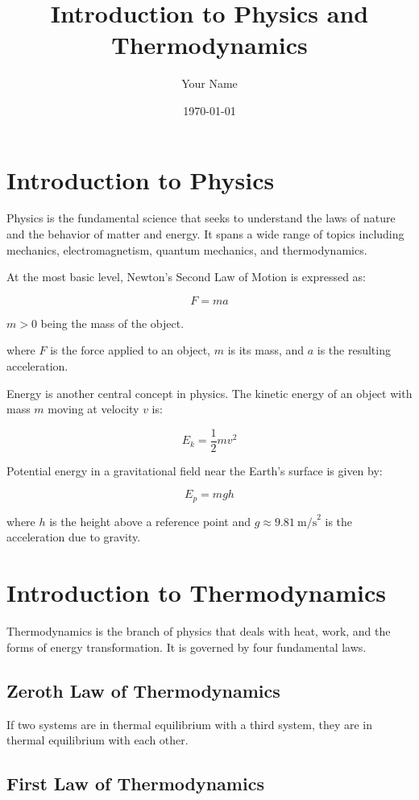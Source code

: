 \documentclass[12pt]{article}
\title{Introduction to Physics and Thermodynamics}
\author{Your Name}
\date{\today}
\begin{document}
\maketitle

\section{Introduction to Physics}

Physics is the fundamental science that seeks to understand the laws of nature and the behavior of matter and energy. It spans a wide range of topics including mechanics, electromagnetism, quantum mechanics, and thermodynamics.

At the most basic level, Newton's Second Law of Motion is expressed as:

\[
F = ma
\]

$m > 0$ being the mass of the object.

where $F$ is the force applied to an object, $m$ is its mass, and $a$ is the resulting acceleration.

Energy is another central concept in physics. The kinetic energy of an object with mass $m$ moving at velocity $v$ is:

\[
E_k = \frac{1}{2}mv^2
\]

Potential energy in a gravitational field near the Earth's surface is given by:

\[
E_p = mgh
\]

where $h$ is the height above a reference point and $g \approx 9.81~\text{m/s}^2$ is the acceleration due to gravity.

\section{Introduction to Thermodynamics}

Thermodynamics is the branch of physics that deals with heat, work, and the forms of energy transformation. It is governed by four fundamental laws.

\subsection{Zeroth Law of Thermodynamics}

If two systems are in thermal equilibrium with a third system, they are in thermal equilibrium with each other.

\subsection{First Law of Thermodynamics}
\end{document}
